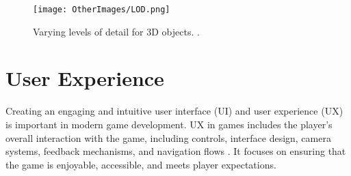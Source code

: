 \documentclass[10pt]{final_report}
\begin{document}
\begin{figure}[H]
    \centering
    \texttt{[image: OtherImages/LOD.png]}
    \caption{Varying levels of detail for 3D objects. \cite{LOD}.}
    \label{fig:LOD}
\end{figure}

\section{User Experience}\label{userexperience}
Creating an engaging and intuitive user interface (UI) and user experience (UX) is important in modern game development. 
UX in games includes the player's overall interaction with the game, including controls, interface design, camera systems, feedback mechanisms, and navigation flows \cite{Kramarzewski2023}. It focuses on ensuring that the game is enjoyable, accessible, and meets player expectations. 
\end{document}
